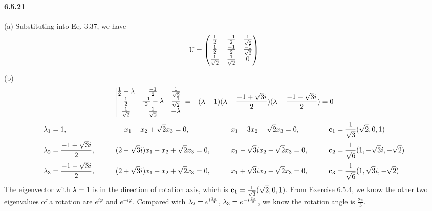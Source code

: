 \documentclass[a4paper]{article}
\begin{document}
\paragraph{6.5.21}
(a) Substituting into Eq. 3.37, we have
\[
\mathrm{U}=
\begin{pmatrix}
\frac{1}{2}&\frac{-1}{2}&\frac{1}{\sqrt{2}}\\
\frac{1}{2}&\frac{-1}{2}&\frac{-1}{\sqrt{2}}\\
\frac{1}{\sqrt{2}}&\frac{1}{\sqrt{2}}&0
\end{pmatrix}
\]

(b)
\[
\begin{vmatrix}
\frac{1}{2}-\lambda&\frac{-1}{2}&\frac{1}{\sqrt{2}}\\
\frac{1}{2}&\frac{-1}{2}-\lambda&\frac{-1}{\sqrt{2}}\\
\frac{1}{\sqrt{2}}&\frac{1}{\sqrt{2}}&-\lambda
\end{vmatrix}=-(\lambda-1)(\lambda-\frac{-1+\sqrt{3}i}{2})(\lambda-\frac{-1-\sqrt{3}i}{2})=0
\]
\begin{alignat*}{4}
    & \lambda_1=1,\qquad && -x_1-x_2+\sqrt{2}x_3=0,\qquad && x_1-3x_2-\sqrt{2}x_3=0,\qquad && \mathbf{c}_1=\frac{1}{\sqrt{3}}(\sqrt{2},0,1)\\
    & \lambda_2=\frac{-1+\sqrt{3}i}{2},\qquad && (2-\sqrt{3}i)x_1-x_2+\sqrt{2}x_3=0,\qquad && x_1-\sqrt{3}ix_2-\sqrt{2}x_3=0,\qquad && \mathbf{c}_2=\frac{1}{\sqrt{6}}(1,-\sqrt{3}i,-\sqrt{2})\\
    & \lambda_3=\frac{-1-\sqrt{3}i}{2},\qquad && (2+\sqrt{3}i)x_1-x_2+\sqrt{2}x_3=0,\qquad && x_1+\sqrt{3}ix_2-\sqrt{2}x_3=0,\qquad && \mathbf{c}_3=\frac{1}{\sqrt{6}}(1,\sqrt{3}i,-\sqrt{2})\\
\end{alignat*}
The eigenvector with $\lambda=1$ is in the direction of rotation axis, which is $\mathbf{c}_1=\frac{1}{\sqrt{3}}(\sqrt{2},0,1)$.
From Exercise 6.5.4, we know the other two eigenvalues of a rotation are $e^{i\varphi}$ and $e^{-i\varphi}$. Compared with $\lambda_2=e^{i\frac{2\pi}{3}}$, $\lambda_3=e^{-i\frac{2\pi}{3}}$, we know the rotation angle is $\frac{2\pi}{3}$.
\end{document}
